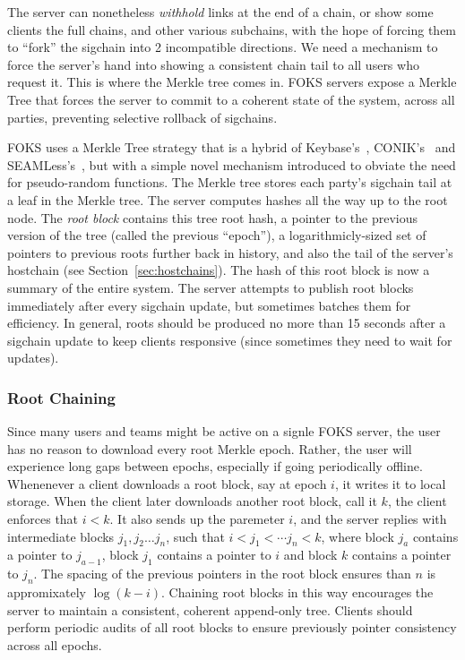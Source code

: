The server can nonetheless \textit{withhold} links at the end of a chain, 
or show some clients the full chains, and other various subchains, with the
hope of forcing them to ``fork'' the sigchain into 2 incompatible directions.
We need a mechanism to force the server's hand into showing a consistent 
chain tail to all users who request it. This is where the Merkle tree
comes in. FOKS servers expose a Merkle Tree that forces the server to commit
to a coherent state of the system, across all parties, preventing selective
rollback of sigchains. 

FOKS uses a Merkle Tree strategy that is a hybrid of Keybase's~\cite{keybase},
CONIK's~\cite{melara2015coniks} and SEAMLess's~\cite{chase2019seemless}, but
with a simple novel mechanism introduced to obviate the need for pseudo-random
functions. The Merkle tree stores each party's sigchain tail at a leaf 
in the Merkle tree. The server computes hashes all the way up to the root node.
The \textit{root block} contains this tree root hash, a pointer to the previous version of
the tree (called the previous ``epoch''), a logarithmicly-sized set of pointers
to previous roots further back in history, and also the tail of the 
server's hostchain (see Section~\ref{sec:hostchains}). The hash of this
root block is now a summary of the entire system. The server attempts to publish
root blocks immediately after every sigchain update, but sometimes batches 
them for efficiency. In general, roots should be produced no more than
15 seconds after a sigchain update to keep clients responsive (since sometimes
they need to wait for updates).

\subsubsection{Root Chaining}

Since many users and teams might be active on a signle FOKS server, 
the user has no reason to download every root Merkle epoch. Rather,
the user will experience long gaps between epochs, especially if going
periodically offline. Whenenever a client downloads a root block,
say at epoch $i$, it writes it to local storage. When the client later
downloads another root block, call it $k$, the client enforces
that $i < k$. It also sends up the paremeter $i$, and the server
replies with intermediate blocks $j_1, j_2 \dots j_n$, such that
$i < j_1 < \cdots j_n < k$,  where block $j_{a}$ contains
a pointer to $j_{a-1}$, block $j_1$ contains a pointer to $i$
and block $k$ contains a pointer to $j_n$. The spacing of the
previous pointers in the root block ensures than $n$ is appromixately
$\log (k-i)$. Chaining root blocks in this way 
encourages the server to maintain a consistent, coherent append-only
tree. Clients should perform periodic audits of all root blocks
to ensure previously pointer consistency across all epochs.

